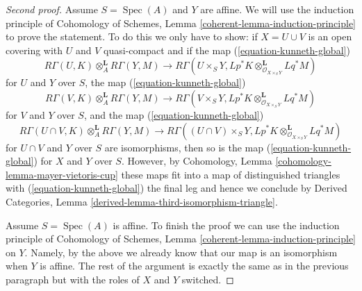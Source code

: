 \documentclass{stacks-project}
\theoremstyle{plain}
\theoremstyle{definition}
\theoremstyle{remark}
\numberwithin{equation}{subsection}
\def\Spec{\mathop{\mathrm{Spec}}}
\begin{document}
\begin{proof}[Second proof]
\medskip\noindent
Assume $S = \Spec(A)$ and $Y$ are affine. We will use the induction
principle of
Cohomology of Schemes, Lemma \ref{coherent-lemma-induction-principle}
to prove the statement. To do this we only have to show:
if $X = U \cup V$ is an open covering with $U$ and $V$ quasi-compact
and if the map (\ref{equation-kunneth-global})
$$
R\Gamma(U, K) \otimes_A^\mathbf{L} R\Gamma(Y, M)
\longrightarrow
R\Gamma(U \times_S Y,
Lp^*K \otimes_{\mathcal{O}_{X \times_S Y}}^\mathbf{L} Lq^*M)
$$
for $U$ and $Y$ over $S$, the map (\ref{equation-kunneth-global})
$$
R\Gamma(V, K) \otimes_A^\mathbf{L} R\Gamma(Y, M)
\longrightarrow
R\Gamma(V \times_S Y,
Lp^*K \otimes_{\mathcal{O}_{X \times_S Y}}^\mathbf{L} Lq^*M)
$$
for $V$ and $Y$ over $S$, and the map (\ref{equation-kunneth-global})
$$
R\Gamma(U \cap V, K) \otimes_A^\mathbf{L} R\Gamma(Y, M)
\longrightarrow
R\Gamma((U \cap V) \times_S Y,
Lp^*K \otimes_{\mathcal{O}_{X \times_S Y}}^\mathbf{L} Lq^*M)
$$
for $U \cap V$ and $Y$ over $S$ are isomorphisms, then so is the map
(\ref{equation-kunneth-global}) for $X$ and $Y$ over $S$.
However, by Cohomology, Lemma \ref{cohomology-lemma-mayer-vietoris-cup}
these maps fit into a map of distinguished triangles with
(\ref{equation-kunneth-global}) the final leg and hence we conclude
by Derived Categories, Lemma \ref{derived-lemma-third-isomorphism-triangle}.

\medskip\noindent
Assume $S = \Spec(A)$ is affine. To finish the proof we can use the
induction principle of
Cohomology of Schemes, Lemma \ref{coherent-lemma-induction-principle}
on $Y$. Namely, by the above we already know that our map is
an isomorphism when $Y$ is affine. The rest of the argument is
exactly the same as in the previous paragraph but with the roles of
$X$ and $Y$ switched.
\end{proof}
\end{document}

